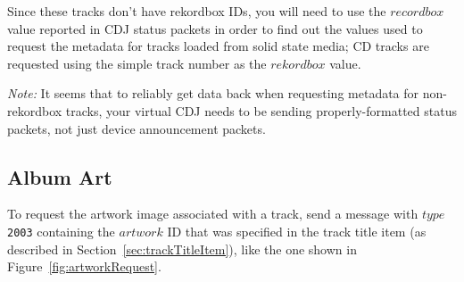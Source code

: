 \documentclass[11pt]{article}
\begin{document}
Since these tracks don't have rekordbox IDs, you will need to use the
$recordbox$ value reported in CDJ status packets in order to find out
the values used to request the metadata for tracks loaded from solid
state media; CD tracks are requested using the simple track number as
the $rekordbox$ value.

\emph{Note:} It seems that to reliably get data back when requesting
metadata for non-rekordbox tracks, your virtual CDJ needs to be
sending properly-formatted status packets, not just device
announcement packets.

\subsection{Album Art}
\label{sec:albumArt}

To request the artwork image associated with a track, send a message
with $type$ {\tt 2003} containing the $artwork$ ID that was
specified in the track title item (as described in
Section~\ref{sec:trackTitleItem}), like the one shown in
Figure~\ref{fig:artworkRequest}.
\end{document}

